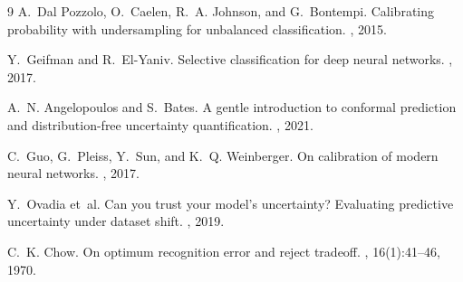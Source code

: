 \documentclass[10pt,a4paper,twocolumn]{article}
\begin{document}
\begin{thebibliography}{9}
A.~Dal Pozzolo, O.~Caelen, R.~A. Johnson, and G.~Bontempi.
\newblock Calibrating probability with undersampling for unbalanced classification.
, 2015.

Y.~Geifman and R.~El-Yaniv.
\newblock Selective classification for deep neural networks.
, 2017.

A.~N. Angelopoulos and S.~Bates.
\newblock A gentle introduction to conformal prediction and distribution-free uncertainty quantification.
, 2021.

C.~Guo, G.~Pleiss, Y.~Sun, and K.~Q. Weinberger.
\newblock On calibration of modern neural networks.
, 2017.

Y.~Ovadia et~al.
\newblock Can you trust your model's uncertainty? Evaluating predictive uncertainty under dataset shift.
, 2019.

C.~K. Chow.
\newblock On optimum recognition error and reject tradeoff.
, 16(1):41--46, 1970.

\end{thebibliography}
\end{document}
